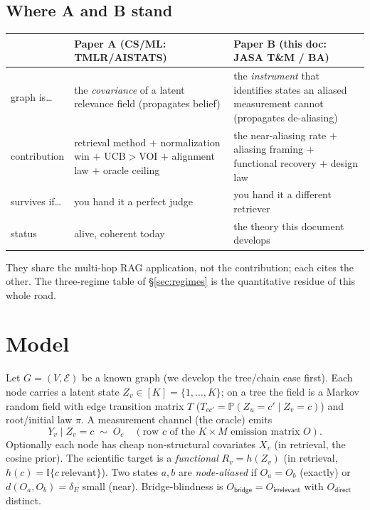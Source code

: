 \documentclass[11pt]{article}
\renewcommand{\Pr}{\mathbb{P}}\newcommand{\I}{\mathbb{I}}\newcommand{\HH}{\mathbb{H}}
\begin{document}
\subsection{Where A and B stand}
\begin{center}\small
\begin{tabular}{p{2.4cm}p{5.4cm}p{5.4cm}}
\toprule
 & \textbf{Paper A} (CS/ML: TMLR/AISTATS) & \textbf{Paper B} (this doc: JASA T\&M / BA) \\ \midrule
graph is\dots & the \emph{covariance} of a latent relevance field (propagates belief) & the \emph{instrument} that
identifies states an aliased measurement cannot (propagates de-aliasing) \\
contribution & retrieval method $+$ normalization win $+$ UCB$>$VOI $+$ alignment law $+$ oracle ceiling & the
near-aliasing rate $+$ aliasing framing $+$ functional recovery $+$ design law \\
survives if\dots & you hand it a perfect judge & you hand it a different retriever \\
status & alive, coherent today & the theory this document develops \\
\bottomrule
\end{tabular}
\end{center}
They share the multi-hop RAG application, not the contribution; each cites the other. The three-regime table of
\S\ref{sec:regimes} is the quantitative residue of this whole road.

\section{Model}
Let $G=(V,\mathcal E)$ be a known graph (we develop the tree/chain case first). Each node carries a latent state
$Z_v\in[K]=\{1,\dots,K\}$; on a tree the field is a Markov random field with edge transition matrix $T$
($T_{cc'}=\Pr(Z_u\!=\!c'\mid Z_v\!=\!c)$) and root/initial law $\pi$. A measurement channel (the oracle) emits
\begin{equation}
  Y_v \mid Z_v=c \;\sim\; O_c \quad(\text{row } c \text{ of the }K\times M\text{ emission matrix } O).
\end{equation}
Optionally each node has cheap non-structural covariates $X_v$ (in retrieval, the cosine prior). The scientific
target is a \emph{functional} $R_v=h(Z_v)$ (in retrieval, $h(c)=\I\{c\ \text{relevant}\}$). Two states $a,b$ are
\emph{node-aliased} if $O_a=O_b$ (exactly) or $d(O_a,O_b)=\delta_E$ small (near). Bridge-blindness is
$O_{\textsf{bridge}}=O_{\textsf{irrelevant}}$ with $O_{\textsf{direct}}$ distinct.
\end{document}
